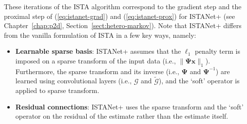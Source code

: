 These iterations of the ISTA algorithm correspond to the gradient step and the proximal step of (\ref{eq:istanet-grad}) and (\ref{eq:istanet-prox}) for ISTANet+ (see Chapter~\ref{chap:p2d}, Section~\ref{sect:hetero-markov}). Note that ISTANet+ differs from the vanilla formulation of ISTA in a few key ways, namely:
\begin{itemize}
    \item \textbf{Learnable sparse basis}: ISTANet+ assumes that the $\ell_1$ penalty term is imposed on a sparse transform of the input data (i.e., $\|\mathbf{\Psi}\mathbf{x}\|_1$). Furthermore, the sparse transform and its inverse (i.e., $\mathbf{\Psi}$ and $\mathbf{\Psi}^{-1}$) are learned using convolutional layers (i.e., $\mathcal{G}$ and $\tilde{\mathcal{G}}$), and the `soft' operator is applied to sparse transform.
    \item \textbf{Residual connections}: ISTANet+ uses the sparse transform and the `soft' operator on the residual of the estimate rather than the estimate itself.
\end{itemize}